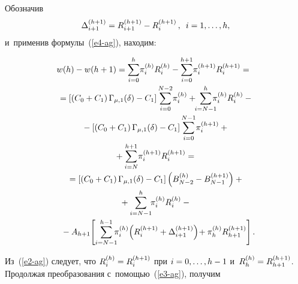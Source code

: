 \begin{multicols}{2}
  Обозначив 
  $$
  \Delta_{i+1}^{(h+1)}= R_{i+1}^{(h+1)}- R_i^{(h+1)}\,,\enskip 
i=1,\ldots , h,
$$
 и~применив формулы~(\ref{e4-ag}), находим:
 
 \columnbreak
 
\noindent
  \begin{multline*}
  \!\!w(h)-w(h+1)=\sum\limits^h_{i=0} \!\pi_i^{(h)} R_i^{(h)}-\sum\limits_{i=0}^{h+1} \!
\pi_i^{(h+1)}R_i^{(h+1)}={}\\[-1pt]
  {}=\left[ \left( C_0+C_1\right) \Gamma_{\mu,1}(\delta) -C_1\right] 
\sum\limits_{i=0}^{N-2} \!\pi_i^{(h)} +\!\!\sum\limits^h_{i=N-1} \!\!\!\!\pi_i^{(h)}R_i^{(h)}-
{}\\[-1pt]
  {}-\left[ \left( C_0+C_1\right) \Gamma_{\mu,1}(\delta) -C_1\right] 
\sum\limits_{i=0}^{N-1} \!\pi_i^{(h+1)} +{}\\[-1pt]
{}+\sum\limits^{h+1}_{i=N} \!\pi_i^{(h+1)} 
R_i^{(h+1)}={}\\[-1pt]
  {}= \left[ \left( C_0+C_1\right)\Gamma_{\mu,1}(\delta) -C_1\right] \left( 
B^{(h)}_{N-2} -B^{(h+1)}_{N-1}\right) +{}\\[-1pt]
{}+\sum\limits^h_{i=N-1}\!\! \pi_i^{(h)} 
R_i^{(h)}-{}\\[-1pt]
  {}- A_{h+1}\!\left[ \sum\limits^{h-1}_{i=N-1}\hspace*{-5.5pt} \pi_i^{(h)} 
  \!\left( R_i^{(h+1)} 
+\Delta^{(h+1)}_{i+1} \right)\! +\pi_h^{(h)}R^{(h+1)}_{h+1}\right].\hspace*{-6.0207pt}
  \end{multline*}
  
  \vspace*{-5pt}
  
  Из~(\ref{e2-ag}) следует, что $R_i^{(h)}\hm= R_i^{(h+1)}$ при $i\hm=0, \ldots 
,h\hm-1$ и~$R_h^{(h)}\hm= R^{(h+1)}_{h+1}$. Продолжая преобразования  
с~по\-мощью~(\ref{e3-ag}), получим 

\vspace*{-10pt}


\end{multicols}
